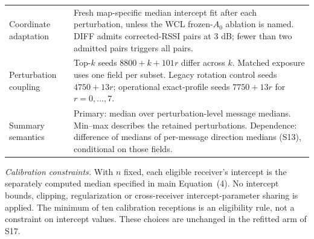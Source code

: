 \documentclass[journal,onecolumn,10pt]{IEEEtran}
\begin{document}
\begin{center}
\begin{minipage}{\textwidth}
\begin{tabular}{@{}p{}p{}@{}}
Coordinate adaptation & Fresh map-specific median intercept fit after each perturbation, unless the WCL frozen-$A_0$ ablation is named. DIFF admits corrected-RSSI pairs at 3 dB; fewer than two admitted pairs triggers all pairs. \\
Perturbation coupling & Top-$k$ seeds $8800+k+101r$ differ across $k$. Matched exposure uses one field per subset. Legacy rotation control seeds $4750+13r$; operational exact-profile seeds $7750+13r$ for $r=0,\ldots,7$. \\
Summary semantics & Primary: median over perturbation-level message medians. Min--max describes the retained perturbations. Dependence: difference of medians of per-message direction medians (S13), conditional on those fields. \\
\bottomrule
\end{tabular}
\end{minipage}\end{center}

\noindent\textit{Calibration constraints.} With $n$ fixed, each eligible receiver's intercept is the separately computed median specified in main Equation~(4). No intercept bounds, clipping, regularization or cross-receiver intercept-parameter sharing is applied. The minimum of ten calibration receptions is an eligibility rule, not a constraint on intercept values. These choices are unchanged in the refitted arm of S17.
\end{document}
